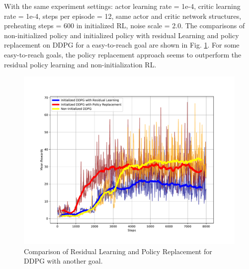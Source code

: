 \documentclass{article}
\begin{document}
With the same experiment settings: actor learning rate = 1e-4, critic learning rate = 1e-4, steps per episode = 12, same actor and critic network structures, preheating steps = 600 in initialized RL, noise scale = 2.0. The comparisons of non-initialized policy and initialized policy with residual Learning and policy replacement on DDPG for a easy-to-reach goal are shown in Fig. \ref{fig:rpl2}. For some easy-to-reach goals, the policy replacement approach seems to outperform the residual policy learning and non-initialization RL.
\begin{figure}[htbp]
	\centering
	\includegraphics[scale=0.5]{img/res_ddpg3.pdf}
	\caption{Comparison of Residual Learning and Policy Replacement for DDPG with another goal.}
	\label{fig:rpl2}
\end{figure}
\end{document}
